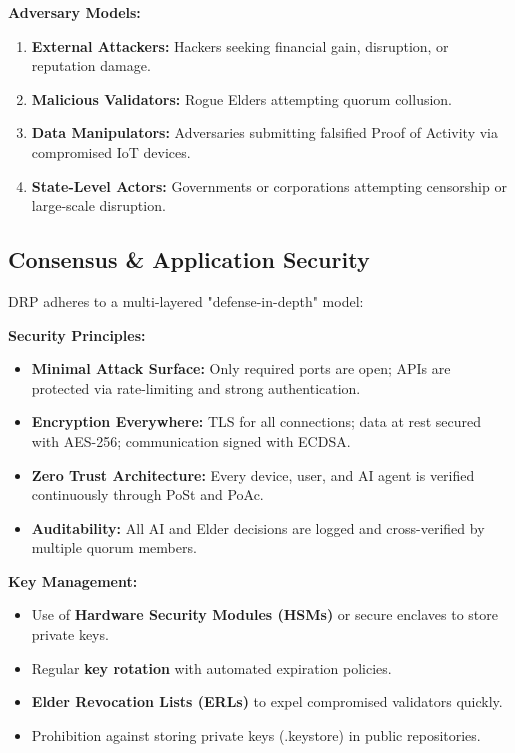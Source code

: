 \documentclass[11pt,a4paper]{article}
\begin{document}
\textbf{Adversary Models:}
\begin{enumerate}
    \item \textbf{External Attackers:} Hackers seeking financial gain, disruption, or reputation damage.
    \item \textbf{Malicious Validators:} Rogue Elders attempting quorum collusion.
    \item \textbf{Data Manipulators:} Adversaries submitting falsified Proof of Activity via compromised IoT devices.
    \item \textbf{State-Level Actors:} Governments or corporations attempting censorship or large-scale disruption.
\end{enumerate}

\subsection{Consensus \& Application Security}
DRP adheres to a multi-layered "defense-in-depth" model:

\textbf{Security Principles:}
\begin{itemize}
    \item \textbf{Minimal Attack Surface:} Only required ports are open; APIs are protected via rate-limiting and strong authentication.
    \item \textbf{Encryption Everywhere:} TLS for all connections; data at rest secured with AES-256; communication signed with ECDSA.
    \item \textbf{Zero Trust Architecture:} Every device, user, and AI agent is verified continuously through PoSt and PoAc.
    \item \textbf{Auditability:} All AI and Elder decisions are logged and cross-verified by multiple quorum members.
\end{itemize}

\textbf{Key Management:}
\begin{itemize}
    \item Use of \textbf{Hardware Security Modules (HSMs)} or secure enclaves to store private keys.
    \item Regular \textbf{key rotation} with automated expiration policies.
    \item \textbf{Elder Revocation Lists (ERLs)} to expel compromised validators quickly.
    \item Prohibition against storing private keys (.keystore) in public repositories.
\end{itemize}
\end{document}
